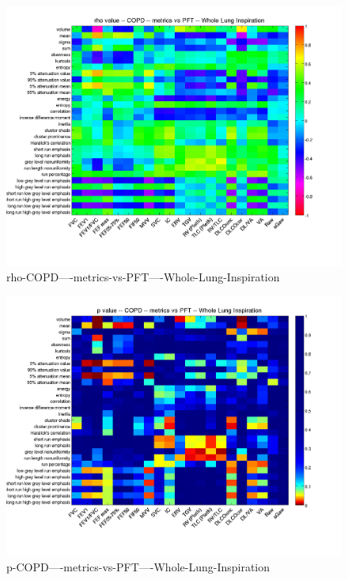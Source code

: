 \documentclass[12pt]{article}
\begin{document}
\begin{figure}
        \includegraphics[width=0.84\linewidth,viewport=100 60 620 550]{corr/rho-COPD----metrics-vs-PFT----Whole-Lung-Inspiration.png}
    \caption{rho-COPD----metrics-vs-PFT----Whole-Lung-Inspiration}
    \label{fig:rho-COPD----metrics-vs-PFT----Whole-Lung-Inspiration}
\end{figure}
\begin{figure}
    \includegraphics[width=0.84\linewidth,viewport=100 60 620 550]{corr/p-COPD----metrics-vs-PFT----Whole-Lung-Inspiration.png}
    \caption{p-COPD----metrics-vs-PFT----Whole-Lung-Inspiration}
    \label{fig:p-COPD----metrics-vs-PFT----Whole-Lung-Inspiration}
\end{figure}
\end{document}
